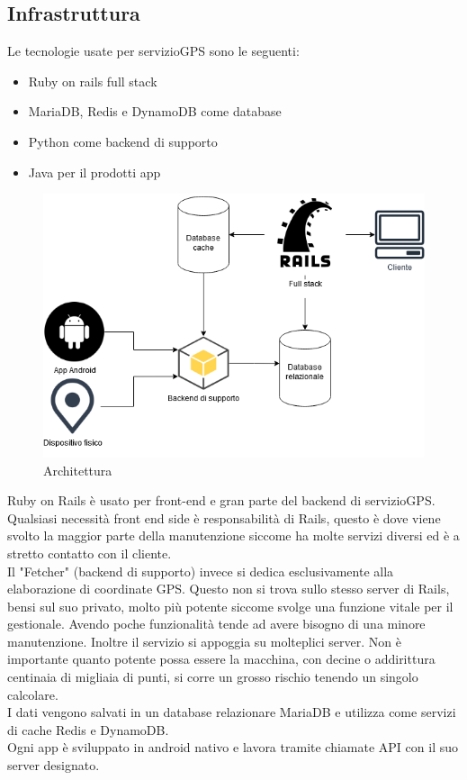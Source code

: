 \documentclass[12pt]{article}
\begin{document}
\subsection{Infrastruttura}
Le tecnologie usate per servizioGPS sono le seguenti:
\begin{itemize}
  \item Ruby on rails full stack
  \item MariaDB, Redis  e DynamoDB come database
  \item Python come backend di supporto
  \item Java per il prodotti app 
\end{itemize}
\begin{figure}[H]
\includegraphics[scale = 0.6]{infrastructure.png}
\caption{Architettura}
\end{figure}
Ruby on Rails è usato per front-end e gran parte del backend di servizioGPS. 
Qualsiasi necessità front end side è responsabilità di Rails, questo è dove 
viene svolto la maggior parte della manutenzione siccome ha molte servizi diversi 
ed è a stretto contatto con il cliente.
\\ Il "Fetcher" (backend di supporto) invece si dedica esclusivamente alla elaborazione
di coordinate GPS. 
Questo non si trova sullo stesso server di Rails, bensi sul suo privato, molto 
più potente siccome svolge una funzione vitale per il gestionale.
Avendo poche funzionalità tende ad avere bisogno di una minore 
manutenzione.
Inoltre il servizio si appoggia su molteplici server. 
Non è importante quanto potente possa essere la macchina, con decine o addirittura 
centinaia di migliaia di punti, si corre un grosso rischio tenendo un singolo 
calcolare.
\\ I dati vengono salvati in un database relazionare MariaDB e utilizza come 
servizi di cache Redis e DynamoDB. 
\\ Ogni app è sviluppato in android nativo e lavora tramite chiamate API 
con il suo server designato. 
\end{document}
